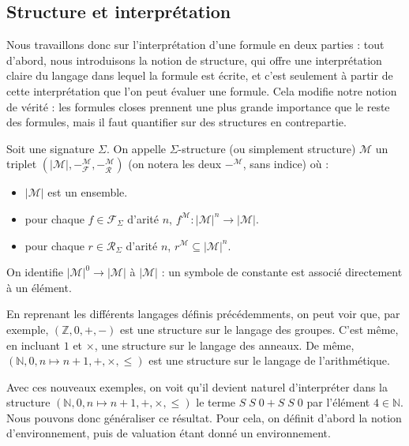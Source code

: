 \subsection{Structure et interprétation}

Nous travaillons donc sur l'interprétation d'une formule en deux parties : tout
d'abord, nous introduisons la notion de structure, qui offre une interprétation
claire du langage dans lequel la formule est écrite, et c'est seulement à partir
de cette interprétation que l'on peut évaluer une formule. Cela modifie notre
notion de vérité : les formules closes prennent une plus grande importance que
le reste des formules, mais il faut quantifier sur des structures en
contrepartie.

\begin{definition}[Structure]
  Soit une signature $\Sigma$. On appelle $\Sigma$-structure (ou simplement
  structure) $\mathcal M$ un triplet
  $(|\mathcal M|,-^{\mathcal M}_\mathcal F,-^{\mathcal M}_\mathcal R)$
  (on notera les deux $-^{\mathcal M}$, sans indice) où :
  \begin{itemize}
  \item $|\mathcal M|$ est un ensemble.
  \item pour chaque $f\in \mathcal F_\Sigma$ d'arité $n$,
    $f^{\mathcal M} : |\mathcal M|^n \to |\mathcal M|$.
  \item pour chaque $r\in\mathcal R_\Sigma$ d'arité $n$,
    $r^{\mathcal M} \subseteq |\mathcal M|^n$.
  \end{itemize}

  On identifie $|\mathcal M|^0 \to |\mathcal M|$ à $|\mathcal M|$ : un symbole
  de constante est associé directement à un élément.
\end{definition}

\begin{example}
  En reprenant les différents langages définis précédemments, on peut voir que,
  par exemple, $(\mathbb Z,0,+,-)$ est une structure sur le langage des groupes.
  C'est même, en incluant $1$ et $\times$, une structure sur le langage des
  anneaux. De même, $(\mathbb N,0,n\mapsto n + 1,+,\times,\leq)$ est une
  structure sur le langage de l'arithmétique.
\end{example}

Avec ces nouveaux exemples, on voit qu'il devient naturel d'interpréter dans la
structure $(\mathbb N,0,n\mapsto n+1,+,\times,\leq)$ le terme $S\;S\;0 + S\;S\;0$
par l'élément $4\in\mathbb N$. Nous pouvons donc généraliser ce résultat. Pour
cela, on définit d'abord la notion d'environnement, puis de valuation étant donné
un environnement.

